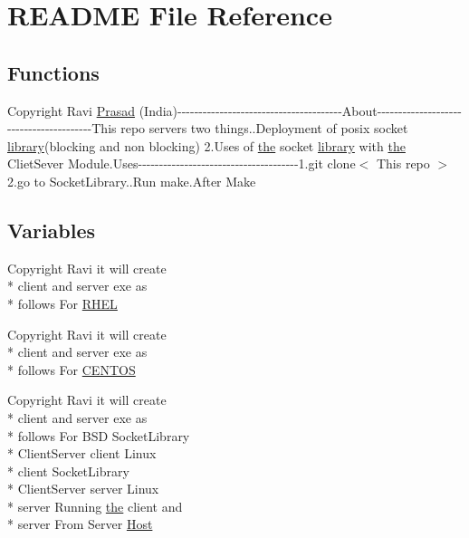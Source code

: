 \hypertarget{README}{\section{R\-E\-A\-D\-M\-E File Reference}
\label{README}
}
\subsection*{Functions}
\begin{DoxyCompactItemize}
\item 
Copyright Ravi \hyperlink{README_acbcec0b507f57bc6fea73bd91bc0323f}{Prasad} (India)-\/-\/-\/-\/-\/-\/-\/-\/-\/-\/-\/-\/-\/-\/-\/-\/-\/-\/-\/-\/-\/-\/-\/-\/-\/-\/-\/-\/-\/-\/-\/-\/-\/-\/-\/-\/-\/-\/-\/About-\/-\/-\/-\/-\/-\/-\/-\/-\/-\/-\/-\/-\/-\/-\/-\/-\/-\/-\/-\/-\/-\/-\/-\/-\/-\/-\/-\/-\/-\/-\/-\/-\/-\/-\/-\/-\/-\/-\/-\/This repo servers two things..\-Deployment of posix socket \hyperlink{ClientServer_2server_2Makefile_a1f477410360bd4832116581b9934ab71}{library}(blocking and non blocking) 2.Uses of \hyperlink{ClientServer_2server_2Makefile_a09c6b60bb7451f9136e25140ffdff6bd}{the} socket \hyperlink{ClientServer_2server_2Makefile_a1f477410360bd4832116581b9934ab71}{library} with \hyperlink{ClientServer_2server_2Makefile_a09c6b60bb7451f9136e25140ffdff6bd}{the} Cliet\-Sever Module.\-Uses-\/-\/-\/-\/-\/-\/-\/-\/-\/-\/-\/-\/-\/-\/-\/-\/-\/-\/-\/-\/-\/-\/-\/-\/-\/-\/-\/-\/-\/-\/-\/-\/-\/-\/-\/-\/-\/-\/1.git clone$<$ This repo $>$ 2.go to Socket\-Library..\-Run make.\-After Make
\end{DoxyCompactItemize}
\subsection*{Variables}
\begin{DoxyCompactItemize}
\item 
Copyright Ravi it will create \\*
client and server exe as \\*
follows For \hyperlink{README_acced105257a718491134c7cae002d48a}{R\-H\-E\-L}
\item 
Copyright Ravi it will create \\*
client and server exe as \\*
follows For \hyperlink{README_abec6047e55a548b2b675ef60ec1a1ff0}{C\-E\-N\-T\-O\-S}
\item 
Copyright Ravi it will create \\*
client and server exe as \\*
follows For B\-S\-D Socket\-Library \\*
Client\-Server client Linux \\*
client Socket\-Library \\*
Client\-Server server Linux \\*
server Running \hyperlink{ClientServer_2server_2Makefile_a09c6b60bb7451f9136e25140ffdff6bd}{the} client and \\*
server From Server \hyperlink{README_a38037a5a8331147623d2579e11a55ddc}{Host}
\end{DoxyCompactItemize}


